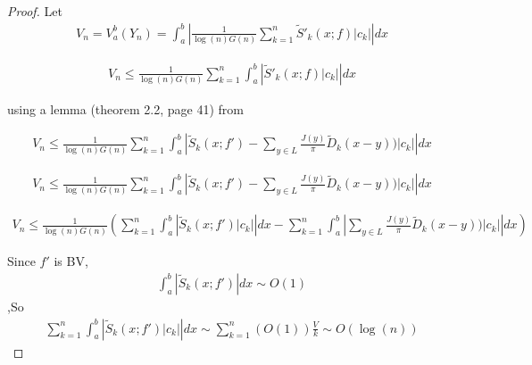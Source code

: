 \documentclass{amsart}
\theoremstyle{definition}
\theoremstyle{remark}
\numberwithin{equation}{section}
\begin{document}
\begin{proof}

	
Let \begin{equation}\begin{aligned}
V_n = V_a^b(Y_n)  = \int_a^b\left|\frac{1}{\log(n) G(n)}\sum_{k=1}^{n}\tilde{S}'_k(x;f)\left|c_k\right| \right|dx 
\end{aligned}\end{equation}
	
\begin{equation}\begin{aligned}
V_n \leq \frac{1}{\log(n) G(n)}\sum_{k=1}^{n}\int_a^b\left|\tilde{S}'_k(x;f)\left|c_k\right| \right|dx
\end{aligned}\end{equation}
	
using a lemma (theorem 2.2, page 41) from \cite{zygmund2002trigonometric}%
	
\begin{equation}\begin{aligned}
V_n \leq \frac{1}{\log(n) G(n)}\sum_{k=1}^{n}\int_a^b\left|\tilde{S}_k(x;f')-\sum_{y\in L}\frac{J(y)}{\pi}\tilde{D}_k(x-y))\left|c_k\right| \right|dx
\end{aligned}\end{equation}
	
\begin{equation}\begin{aligned}
V_n \leq \frac{1}{\log(n) G(n)}\sum_{k=1}^{n}\int_a^b\left|\tilde{S}_k(x;f')-\sum_{y\in L}\frac{J(y)}{\pi}\tilde{D}_k(x-y))\left|c_k\right| \right|dx
\end{aligned}\end{equation}
	
\begin{equation}\begin{aligned}
V_n \leq  \frac{1}{\log(n) G(n)}(\sum_{k=1}^{n}\int_a^b\left|\tilde{S}_k(x;f')\left|c_k\right|\right|dx-\sum_{k=1}^{n}\int_a^b\left|\sum_{y\in L}\frac{J(y)}{\pi}\tilde{D}_k(x-y))\left|c_k\right| \right|dx)
\end{aligned}\end{equation}
	
Since $f'$ is BV, 
\begin{equation}
\begin{aligned}
\int_a^b\left|\tilde{S}_k(x;f')\right|dx \sim O(1)\end{aligned}
\end{equation}
,So
\begin{equation}
\begin{aligned}
\sum_{k=1}^{n}\int_a^b\left|\tilde{S}_k(x;f')\left|c_k\right|\right|dx \sim \sum_{k=1}^{n}(O(1))\frac{V}{k} \sim O(\log(n))
\end{aligned}
\end{equation}


\end{proof}
\end{document}
